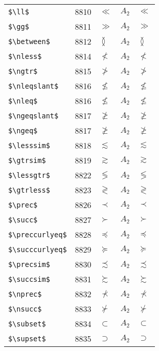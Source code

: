 \documentclass{article}
\begin{document}
\begin{table}
\begin{center}
\begin{tabular}{llll}
 \verb#$\ll$#          & 8810    & $\ll$          & $A_2\quad \ll$\\
 \verb#$\gg$#          & 8811    & $\gg$          & $A_2\quad \gg$\\
 \verb#$\between$#     & 8812    & $\between$     & $A_2\quad \between$\\
 \verb#$\nless$#       & 8814    & $\nless$       & $A_2\quad \nless$\\
 \verb#$\ngtr$#        & 8815    & $\ngtr$        & $A_2\quad \ngtr$\\
 \verb#$\nleqslant$#   & 8816    & $\nleqslant$   & $A_2\quad \nleqslant$\\
 \verb#$\nleq$#        & 8816    & $\nleq$        & $A_2\quad \nleq$\\
 \verb#$\ngeqslant$#   & 8817    & $\ngeqslant$   & $A_2\quad \ngeqslant$\\
 \verb#$\ngeq$#        & 8817    & $\ngeq$        & $A_2\quad \ngeq$\\
 \verb#$\lesssim$#     & 8818    & $\lesssim$     & $A_2\quad \lesssim$\\
 \verb#$\gtrsim$#      & 8819    & $\gtrsim$      & $A_2\quad \gtrsim$\\
 \verb#$\lessgtr$#     & 8822    & $\lessgtr$     & $A_2\quad \lessgtr$\\
 \verb#$\gtrless$#     & 8823    & $\gtrless$     & $A_2\quad \gtrless$\\
 \verb#$\prec$#        & 8826    & $\prec$        & $A_2\quad \prec$\\
 \verb#$\succ$#        & 8827    & $\succ$        & $A_2\quad \succ$\\
 \verb#$\preccurlyeq$# & 8828    & $\preccurlyeq$ & $A_2\quad \preccurlyeq$\\
 \verb#$\succcurlyeq$# & 8829    & $\succcurlyeq$ & $A_2\quad \succcurlyeq$\\
 \verb#$\precsim$#     & 8830    & $\precsim$     & $A_2\quad \precsim$\\
 \verb#$\succsim$#     & 8831    & $\succsim$     & $A_2\quad \succsim$\\
 \verb#$\nprec$#       & 8832    & $\nprec$       & $A_2\quad \nprec$\\
 \verb#$\nsucc$#       & 8833    & $\nsucc$       & $A_2\quad \nsucc$\\
 \verb#$\subset$#      & 8834    & $\subset$      & $A_2\quad \subset$\\
 \verb#$\supset$#      & 8835    & $\supset$      & $A_2\quad \supset$\\

\end{tabular}
\end{center}
\end{table}
\end{document}
